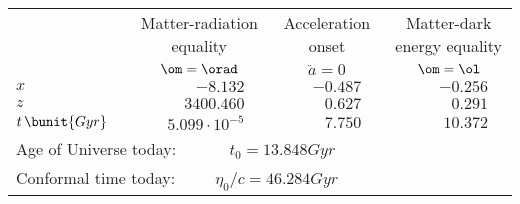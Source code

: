 \begin{tabular}{l rrr}
  \toprule
   \rule{0ex}{2ex} & \multicolumn{1}{c}{Matter-radiation equality} & \multicolumn{1}{c}{Acceleration onset} & \multicolumn{1}{c}{Matter-dark energy equality}  \\ [0.5ex]
    & \multicolumn{1}{c}{$\om=\orad$} & \multicolumn{1}{c}{$\ddot{a}=0$} & \multicolumn{1}{c}{$\om=\ol$}  \\ [0.5ex]
  \midrule
  \multicolumn{1}{l|}{\rule{0pt}{3ex}$x\quad$}              & $-8.132\quad$             & $-0.487\quad$ & $-0.256\quad$  \\ [0.5ex]
  \multicolumn{1}{l|}{\rule{0pt}{1ex}$z\quad$}              & $3400.460\quad$           & $0.627\quad$  & $0.291\quad$   \\ [0.5ex]
  \multicolumn{1}{l|}{\rule{0pt}{1ex}$t\,\bunit{Gyr}\quad$} & $5.099\cdot 10^{-5}\quad$ & $7.750\quad$  & $10.372\quad$  \\ [0.5ex]
  \midrule
  \midrule
  \multicolumn{4}{l}{\rule{0pt}{3ex} Age of Universe today: $\qquad\quad t_0=13.848\unit{Gyr}$} \\ 
  \multicolumn{4}{l}{\rule{0pt}{3ex} Conformal time today: $\qquad\, \eta_0 / c = 46.284\unit{Gyr}$} \\ [1ex]
  \bottomrule
  \end{tabular}
  